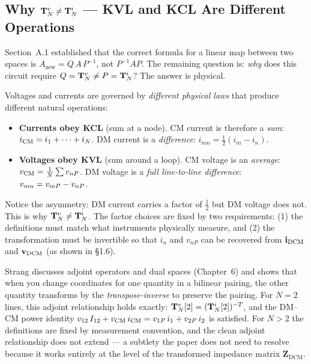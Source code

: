 \subsection{Why $\mathbf{T}^{v}_{N} \neq \mathbf{T}^{i}_{N}$ — KVL and KCL Are Different Operations}

Section~A.1 established that the correct formula for a linear map
between two spaces is $A_{\mathrm{new}} = Q\,A\,P^{-1}$, not
$P^{-1}AP$.  The remaining question is: \emph{why} does this circuit
require $Q = \mathbf{T}^{v}_{N} \neq P = \mathbf{T}^{i}_{N}$?  The answer is physical.

Voltages and currents are governed by \emph{different physical laws}
that produce different natural operations:

\begin{itemize}
    \item \textbf{Currents obey KCL} (sum at a node).  CM current is
          therefore a \emph{sum}: $i_{\mathrm{CM}} = i_1 + \cdots + i_N$.
          DM current is a \emph{difference}: $i_{mn} =
          \tfrac{1}{2}(i_m - i_n)$.

    \item \textbf{Voltages obey KVL} (sum around a loop).  CM voltage
          is an \emph{average}: $v_{\mathrm{CM}} = \tfrac{1}{N}\sum v_{nP}$.
          DM voltage is a \emph{full line-to-line difference}:
          $v_{mn} = v_{mP} - v_{nP}$.
\end{itemize}

Notice the asymmetry: DM current carries a factor of $\tfrac{1}{2}$
but DM voltage does not.  This is why $\mathbf{T}^{v}_{N} \neq \mathbf{T}^{i}_{N}$.  The factor
choices are fixed by two requirements: (1) the definitions must match
what instruments physically measure, and (2) the transformation must
be invertible so that $i_n$ and $v_{nP}$ can be recovered from
$\mathbf{i}_{\mathrm{DCM}}$ and $\mathbf{v}_{\mathrm{DCM}}$ (as shown in \S1.6).

Strang discusses adjoint operators and dual spaces (Chapter~6) and
shows that when you change coordinates for one quantity in a bilinear
pairing, the other quantity transforms by the \emph{transpose-inverse}
to preserve the pairing.  For $N = 2$ lines, this adjoint
relationship holds exactly: $\mathbf{T}^{v}_{N}[2] = (\mathbf{T}^{i}_{N}[2])^{-T}$, and the
DM--CM power identity $v_{12}\,I_{12} + v_{\mathrm{CM}}\,i_{\mathrm{CM}} =
v_{1P}\,i_1 + v_{2P}\,i_2$ is satisfied.  For $N > 2$ the
definitions are fixed by measurement convention, and the clean
adjoint relationship does not extend — a subtlety the paper does not
need to resolve because it works entirely at the level of the
transformed impedance matrix $\mathbf{Z}_{\mathrm{DCM}}$.

